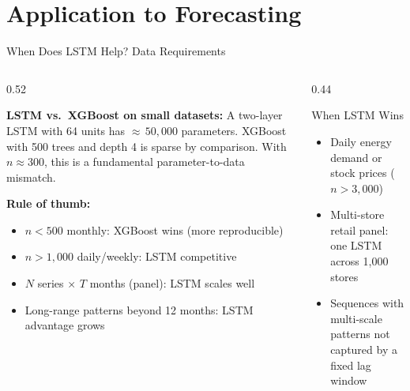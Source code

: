 \documentclass[aspectratio=169, 10pt]{beamer}
\begin{document}
\section{Application to Forecasting}


\begin{frame}{When Does LSTM Help? Data Requirements}
  \begin{columns}[T]
    \begin{column}{0.52\textwidth}
      \begin{warningbox}
        \textbf{LSTM vs.\ XGBoost on small datasets:}
        A two-layer LSTM with 64 units has ${\approx}\,50{,}000$ parameters.
        XGBoost with 500 trees and depth 4 is sparse by comparison.
        With $n \approx 300$, this is a fundamental
        parameter-to-data mismatch.
      \end{warningbox}

      \medskip
      \textbf{Rule of thumb:}
      \begin{itemize}
        \item $n < 500$ monthly: XGBoost wins (more reproducible)
        \item $n > 1{,}000$ daily/weekly: LSTM competitive
        \item $N$ series $\times$ $T$ months (panel): LSTM scales well
        \item Long-range patterns beyond 12 months: LSTM advantage
              grows
      \end{itemize}
    \end{column}
    \begin{column}{0.44\textwidth}
      \begin{examplebox}{When LSTM Wins}
        \begin{itemize}
          \item Daily energy demand or stock prices ($n > 3{,}000$)
          \item Multi-store retail panel: one LSTM across 1,000 stores
          \item Sequences with multi-scale patterns not captured by
                a fixed lag window
        \end{itemize}
      \end{examplebox}

      \medskip
    \end{column}
  \end{columns}
\end{frame}
\end{document}
